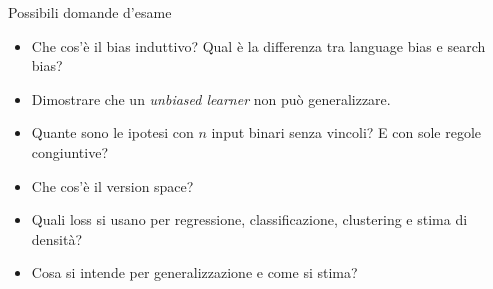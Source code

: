 \begin{boxquestion}{Possibili domande d'esame}

\begin{itemize}
\tightlist
\item
  Che cos'è il bias induttivo? Qual è la differenza tra language bias e
  search bias?
\item
  Dimostrare che un \emph{unbiased learner} non può generalizzare.
\item
  Quante sono le ipotesi con \(n\) input binari senza vincoli? E con
  sole regole congiuntive?
\item
  Che cos'è il version space?
\item
  Quali loss si usano per regressione, classificazione, clustering e
  stima di densità?
\item
  Cosa si intende per generalizzazione e come si stima?
\end{itemize}

\end{boxquestion}
